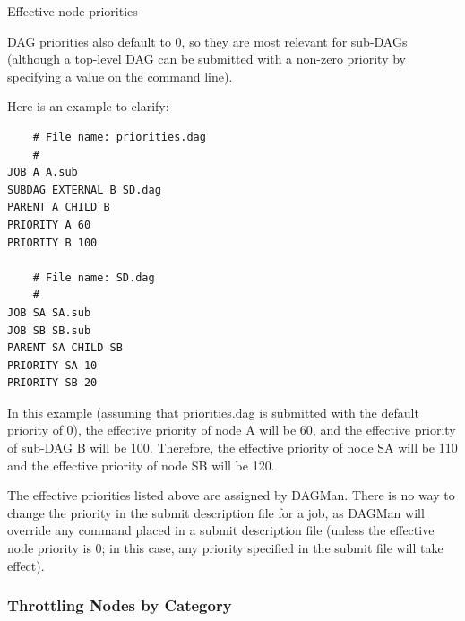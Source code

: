 \begin{description}
\item[Effective node priorities]
\end{description}

  DAG priorities also default to 0, so they
are most relevant for sub-DAGs (although a top-level DAG can
be submitted with a non-zero priority by specifying a 
value on the  command line).

Here is an example to clarify:

\footnotesize
\begin{verbatim}
    # File name: priorities.dag
    #
JOB A A.sub
SUBDAG EXTERNAL B SD.dag
PARENT A CHILD B
PRIORITY A 60
PRIORITY B 100

    # File name: SD.dag
    #
JOB SA SA.sub
JOB SB SB.sub
PARENT SA CHILD SB
PRIORITY SA 10
PRIORITY SB 20
\end{verbatim}
\normalsize

In this example (assuming that priorities.dag is submitted with the
default priority of 0), the effective priority of node A will be 60,
and the effective priority of sub-DAG B will be 100.  Therefore, the
effective priority of node SA will be 110 and the effective priority
of node SB will be 120.

The effective priorities listed above are assigned by DAGMan.
There is no way to change the priority in the submit description file for a job,
as DAGMan will override any  command placed
in a submit description file (unless the effective node priority is
0; in this case, any priority specified in the submit file will
take effect).

\subsubsection{\label{sec:DAG-node-category}Throttling Nodes by Category}

